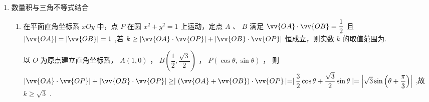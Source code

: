 \begin{enumerate}
\begin{enumerate}
\begin{jieda}
            所以 ${\lambda }_{1},{\lambda }_{2}$ 是方程 $6\left( {k + 3}\right) {x}^{2} - 4\left( {k + 3}\right) x + k = 0$ 的两根,由 ${\lambda }_{1}{\lambda }_{2} \neq  0$ 得 $k \neq  0$ ,
            $k =  - 3$ 时方程无解,故 $k \neq  0$ 且 $k \neq   - 3,\Delta  = 8\left( {k + 3}\right) \left( {6 - k}\right)  > 0$
            
            根据韦达定理有$\left\{\begin{array}{l}
                 {\lambda }_{1} + {\lambda }_{2} = \dfrac{2}{3}  \\
                 {\lambda }_{1}{\lambda }_{2} = \dfrac{k}{6\left( {k + 3}\right) } 
            \end{array}\right.$，所以 $\left| {{\lambda }_{1} - {\lambda }_{2}}\right|  = \sqrt{{\left( {\lambda }_{1} + {\lambda }_{2}\right) }^{2} - 4{\lambda }_{1}{\lambda }_{2}} = \sqrt{\dfrac{4}{9} - \dfrac{4k}{6\left( {k + 3}\right) }} = \dfrac{\sqrt{8\left( {k + 3}\right) \left( {6 - k}\right) }}{6\left( {k + 3}\right) }$
            
            所以  $\left| {{\vv{c}}_{1} - {\vv{c}}_{2}}\right|  = \left| {{\lambda }_{1} - {\lambda }_{2}}\right| \left| {\vv{a} + 3\vv{b}}\right| = \sqrt{6\left( {k + 3}\right) }\left| {{\lambda }_{1} - {\lambda }_{2}}\right|  = \sqrt{\dfrac{4}{3}\left( {6 - k}\right) }$ ,
            由 $- 3 < k \leq  3$ 且 $k \neq  0$ 得 $\left| {{\vv{c}}_{1} - {\vv{c}}_{2}}\right|$ 的范围是 $\left\lbrack  {2,2\sqrt{2})\cup (2\sqrt{2},2\sqrt{3}}\right)$ .
        \end{jieda}
    \end{enumerate}

    \item 数量积与三角不等式结合
    \begin{enumerate}
        \item 在平面直角坐标系 ${xOy}$ 中，点 $P$ 在圆 ${x}^{2} + {y}^{2} = 1$ 上运动，定点 $A$ 、 $B$ 满足 $\vv{OA} \cdot  \vv{OB} = \dfrac{1}{2}$ 且 $\left| \vv{OA}\right|  = \left| \vv{OB}\right|  = 1$ ,若 $k \geq  \left| {\vv{OA} \cdot  \vv{OP}}\right|  + \left| {\vv{OB} \cdot  \vv{OP}}\right|$ 恒成立，则实数 $k$ 的取值范围为.
        \begin{jieda}
            以 $O$ 为原点建立直角坐标系， $A\left( {1,0}\right)$ ， $B\left( {\dfrac{1}{2},\dfrac{\sqrt{3}}{2}}\right)$ ， $P\left( {\cos \theta ,\sin \theta }\right)$ ， 则 $\left| {\vv{OA} \cdot  \vv{OP}}\right|  + \left| {\vv{OB} \cdot  \vv{OP}}\right|  \geq   \mid  (\vv{OA} +  \vv{OB}) \cdot  \vv{OP}\left|  = \right| \dfrac{3}{2}\cos \theta  + \dfrac{\sqrt{3}}{2}\sin \theta  \mid   =  \left| {\sqrt{3}\sin \left( {\theta  + \dfrac{\pi }{3}}\right) }\right|$ ,故 $k \geq  \sqrt{3}$ .


\end{jieda}
\end{enumerate}
\end{enumerate}
